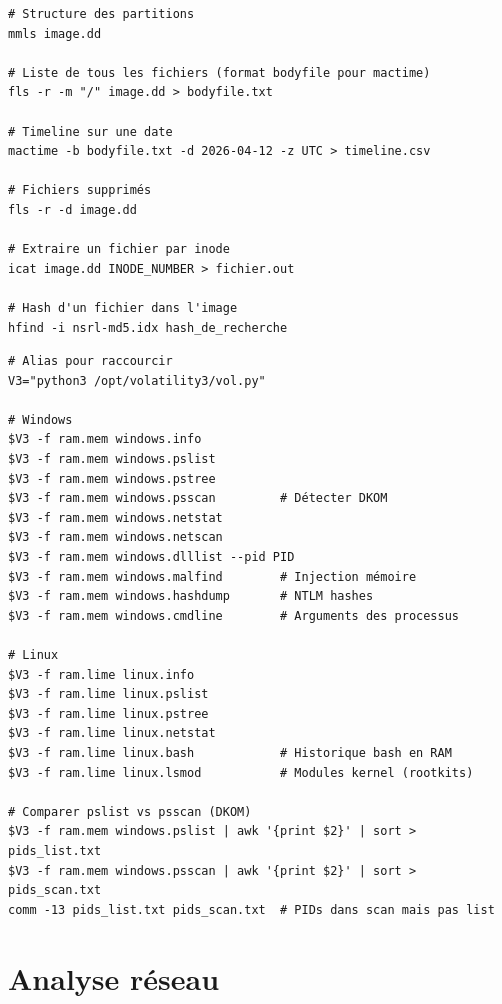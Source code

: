 \begin{lstlisting}[style=StyleTerminal,
  caption={Commandes essentielles: The Sleuth Kit},
  label={lst:tools-tsk}]
# Structure des partitions
mmls image.dd

# Liste de tous les fichiers (format bodyfile pour mactime)
fls -r -m "/" image.dd > bodyfile.txt

# Timeline sur une date
mactime -b bodyfile.txt -d 2026-04-12 -z UTC > timeline.csv

# Fichiers supprimés
fls -r -d image.dd

# Extraire un fichier par inode
icat image.dd INODE_NUMBER > fichier.out

# Hash d'un fichier dans l'image
hfind -i nsrl-md5.idx hash_de_recherche
\end{lstlisting}

\begin{lstlisting}[style=StyleTerminal,
  caption={Commandes essentielles: Volatility~3},
  label={lst:tools-vol3}]
# Alias pour raccourcir
V3="python3 /opt/volatility3/vol.py"

# Windows
$V3 -f ram.mem windows.info
$V3 -f ram.mem windows.pslist
$V3 -f ram.mem windows.pstree
$V3 -f ram.mem windows.psscan         # Détecter DKOM
$V3 -f ram.mem windows.netstat
$V3 -f ram.mem windows.netscan
$V3 -f ram.mem windows.dlllist --pid PID
$V3 -f ram.mem windows.malfind        # Injection mémoire
$V3 -f ram.mem windows.hashdump       # NTLM hashes
$V3 -f ram.mem windows.cmdline        # Arguments des processus

# Linux
$V3 -f ram.lime linux.info
$V3 -f ram.lime linux.pslist
$V3 -f ram.lime linux.pstree
$V3 -f ram.lime linux.netstat
$V3 -f ram.lime linux.bash            # Historique bash en RAM
$V3 -f ram.lime linux.lsmod           # Modules kernel (rootkits)

# Comparer pslist vs psscan (DKOM)
$V3 -f ram.mem windows.pslist | awk '{print $2}' | sort > pids_list.txt
$V3 -f ram.mem windows.psscan | awk '{print $2}' | sort > pids_scan.txt
comm -13 pids_list.txt pids_scan.txt  # PIDs dans scan mais pas list
\end{lstlisting}

\section{Analyse réseau}
\label{ann:tools-network}

